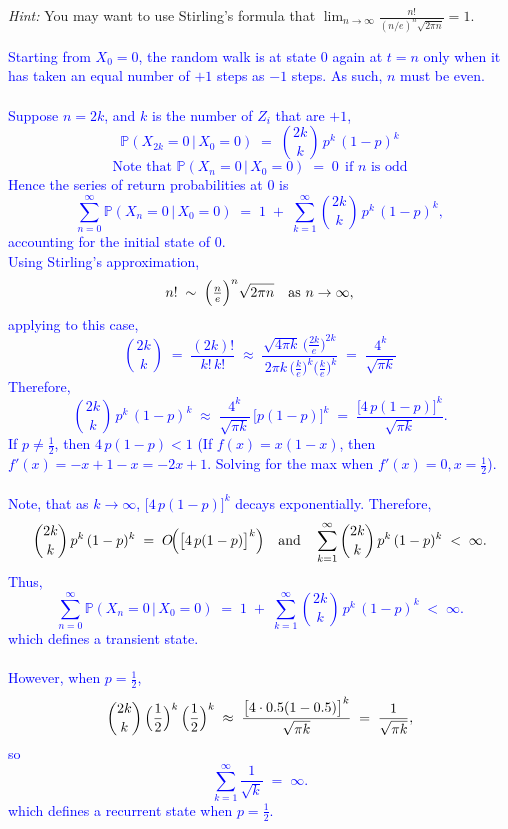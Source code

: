 \documentclass{article}
\begin{document}
    \textit{Hint:} You may want to use Stirling’s formula that $\lim_{n \to \infty} \frac{n!}{(n/e)^n \sqrt{2\pi n}} = 1$.


    \textcolor{blue}{
Starting from \(X_0 = 0\), the random walk is at state \(0\) again at \(t=n\) only when it has taken an equal number of \(+1\) steps as \(-1\) steps. As such, \(n\) must be even. \\ \\ Suppose \(n = 2k\), and \(k\) is the number of \(Z_i\) that are \(+1\),
\[
  \mathbb{P}(X_{2k} = 0 \,\big\vert\, X_0 = 0)
  \;=\;
  \binom{2k}{k}\, p^k\, (1-p)^k
\]
\[
    \text{Note that }\mathbb{P}(X_n = 0 \,\big\vert\, X_0 = 0) \;=\; 0
  \ \ \text{if $n$ is odd}
\]
Hence the series of return probabilities at \(0\) is
\[
  \sum_{n=0}^\infty \mathbb{P}(X_n = 0 \,\big\vert\, X_0 = 0)
  \;=\;
  1 \;+\; \sum_{k=1}^\infty \binom{2k}{k}\, p^k\, (1-p)^k,
\]
accounting for the initial state of 0. \\ Using Stirling's approximation,
\medskip
\noindent
\[
  n! \;\sim\; \Bigl(\tfrac{n}{e}\Bigr)^{n}\sqrt{2\pi n}
  \quad\text{as }n \to \infty,
\]
applying to this case,
\[
  \binom{2k}{k}
  \;=\;
  \frac{(2k)!}{k!\,k!}
  \;\approx\;
  \frac{\sqrt{4\pi k}\,\bigl(\tfrac{2k}{e}\bigr)^{2k}}{\,2\pi k\,\bigl(\tfrac{k}{e}\bigr)^{k}\bigl(\tfrac{k}{e}\bigr)^{k}}
  \;=\;
  \frac{4^k}{\sqrt{\pi k}}
\]
Therefore,
\[
  \binom{2k}{k}\,p^k\,(1-p)^k
  \;\approx\;
  \frac{4^k}{\sqrt{\pi k}} \,\bigl[p(1-p)\bigr]^k
  \;=\;
  \frac{\bigl[4\,p(1-p)\bigr]^k}{\sqrt{\pi k}}.
\]
\medskip
\noindent
If $p \neq \frac{1}{2}$, then \(4\,p(1-p) < 1\) (If $f(x)=x(1-x)$, then $f'(x)=-x+1-x=-2x+1$. Solving for the max when $f'(x)=0, x=\frac{1}{2}$). \\ \\ 
Note, that as \(k \to \infty\), \(\bigl[4\,p(1-p)\bigr]^k\) decays exponentially. Therefore,
\[
  \binom{2k}{k}\,p^k\,(1-p)^k
  \;=\;
  O\!\Bigl(\bigl[4\,p(1-p)\bigr]^k\Bigr)
  \quad
  \text{and}
  \quad
  \sum_{k=1}^{\infty} \binom{2k}{k}\,p^k\,(1-p)^k
  \;<\;\infty.
\]
Thus,
\[
  \sum_{n=0}^\infty \mathbb{P}(X_n = 0 \,\big\vert\, X_0 = 0)
  \;=\;
  1 \;+\;
  \sum_{k=1}^{\infty}
  \binom{2k}{k}\, p^k\,(1-p)^k
  \;<\;
  \infty.
\]
which defines a transient state. \\ \\ 
\medskip
\noindent
However, when \(p = \frac{1}{2}\),
\[
  \binom{2k}{k}\,\Bigl(\frac12\Bigr)^k\,\Bigl(\frac12\Bigr)^k
  \;\approx\;
    \frac{\bigl[4\cdot 0.5(1-0.5)\bigr]^k}{\sqrt{\pi k}}
  \;=\;
  \frac{1}{\sqrt{\pi k}},
\]
so
\[
  \sum_{k=1}^\infty \frac{1}{\sqrt{k}}
  \;=\;
  \infty.
\]
which defines a recurrent state when $p=\frac12$. }
\end{document}
